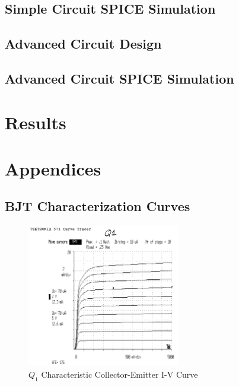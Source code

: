 \documentclass[titlepage, letterpaper, 10.5pt]{article}
\begin{document}
\subsection{Simple Circuit SPICE Simulation}

\subsection{Advanced Circuit Design}

\subsection{Advanced Circuit SPICE Simulation}

\section{Results}

\section{Appendices}

\clearpage
\subsection{BJT Characterization Curves}
\label{bjt-appendix}

\begin{figure}[ht]
	\centering
	\includegraphics[width=0.6\textwidth]{results/q1-characteristics}
	\caption{$Q_{1}$ Characteristic Collector-Emitter I-V Curve}
\end{figure}
\end{document}
